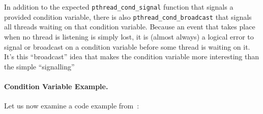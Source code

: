 In addition to the expected \texttt{pthread\_cond\_signal} function that signals a provided condition variable, there is also \texttt{pthread\_cond\_broadcast} that signals all threads waiting on that condition variable. Because an event that takes place when no thread is listening is simply lost, it is (almost always) a logical error to signal or broadcast on a condition variable before some thread is waiting on it. It's this ``broadcast'' idea that makes the condition variable more interesting than the simple ``signalling'' 

\paragraph{Condition Variable Example.} Let us now examine a code example from~\cite{pthreads}:

